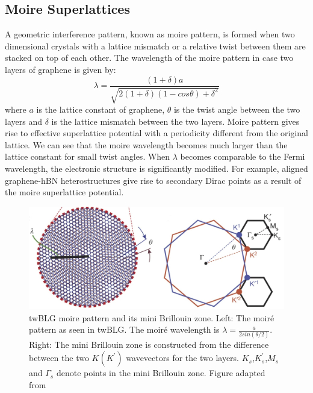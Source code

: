 \subsection{Moire Superlattices}
A geometric interference pattern, known as moire pattern, is formed when two dimensional crystals with a lattice mismatch or a relative twist between them are stacked on top of each other. The wavelength of the moire pattern in case two layers of graphene is given by:
\begin{equation}
    \lambda = \frac{(1+\delta)a}{\sqrt{2(1+\delta)(1-cos\theta)+\delta^2}}
\end{equation}
where $a$ is the lattice constant of graphene, $\theta$ is the twist angle between the two layers and $\delta$ is the lattice mismatch between the two layers. Moire pattern gives rise to effective superlattice potential with a periodicity different from the original lattice. We can see that the moire wavelength becomes much larger than the lattice constant for small twist angles. When $\lambda$ becomes comparable to the Fermi wavelength, the electronic structure is significantly modified. For example, aligned graphene-hBN heterostructures give rise to secondary Dirac points as a result of the moire superlattice potential.
 \begin{figure}[H]
        \centering
         \includegraphics[width=\textwidth]{figures/twblg_lattice.jpg}
         \caption{twBLG moire pattern and its mini Brillouin zone. Left:  The moiré pattern as seen in twBLG. The moiré wavelength is $\lambda=\frac{a}{2sin(\theta/2)}$. Right: The mini Brillouin zone is constructed from the difference between the two $K(K^\prime)$ wavevectors for the two layers. $K_s$,$K_s^\prime$,$M_s$ and $\Gamma_s$ denote points in the mini Brillouin zone. Figure adapted from \cite{Cao2018}}
         \label{fig:twblg_lattice}
\end{figure}

